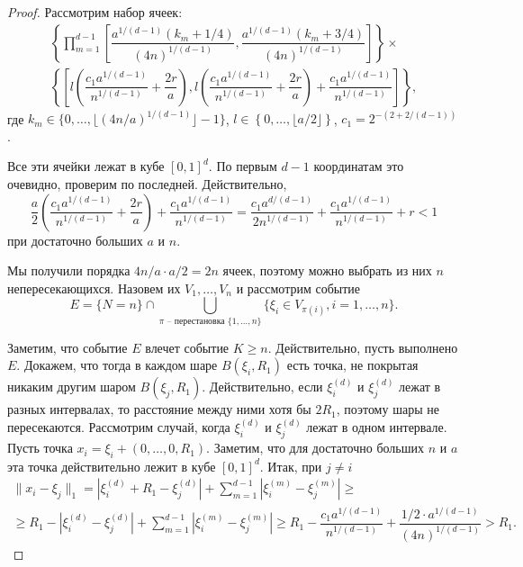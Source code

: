 \documentclass[12pt]{article}
\theoremstyle{plain}
\theoremstyle{definition}
\theoremstyle{remark}
\def\geq{\geqslant}
\begin{document}
\begin{proof}
    Рассмотрим набор ячеек: 
    \begin{multline*}
        \left\{\prod\limits_{m=1}^{d-1}\left[\dfrac{a^{1/(d-1)}(k_m+1/4)}{(4n)^{1/(d-1)}}, \dfrac{a^{1/(d-1)}(k_m+3/4)}{(4n)^{1/(d-1)}}\right]\right\}
    \times \\
    \left\{\left[l\left(\dfrac{c_1a^{1/(d-1)}}{n^{1/(d-1)}} +\dfrac{2r}{a}\right) ,  l\left(\dfrac{c_1a^{1/(d-1)}}{n^{1/(d-1)}}+\dfrac{2r}{a}\right) + \dfrac{c_1a^{1/(d-1)}}{n^{1/(d-1)}}  \right]\right\},
    \end{multline*}{}
    где $k_m \in \{0, \ldots, \lfloor (4n/a)^{1/(d-1)}\rfloor-1\}$, $l\in \left\{0, \ldots, \lfloor a/2\rfloor\right\}$, $c_1 = 2^{-(2+2/(d-1))}$. 
    
    Все эти ячейки лежат в кубе $[0,1]^d$. По первым $d-1$ координатам это очевидно, проверим по последней. Действительно, 
    \begin{equation*}
        \dfrac{a}{2}\left(\dfrac{c_1a^{1/(d-1)}}{n^{1/(d-1)}}+\dfrac{2r}{a}\right) + \dfrac{c_1a^{1/(d-1)}}{n^{1/(d-1)}} = \dfrac{c_1a^{d/(d-1)}}{2n^{1/(d-1)}} + \dfrac{c_1a^{1/(d-1)}}{n^{1/(d-1)}} + r < 1
    \end{equation*}{}
    при достаточно больших $a$ и $n$.
    
    Мы получили порядка $4n/a \cdot a/2 = 2n$ ячеек, поэтому можно выбрать из них $n$ непересекающихся. Назовем их $V_1, \ldots, V_n$  и рассмотрим событие $$E = \{N=n\}\cap \bigcup\limits_{\pi \text{ -- перестановка } \{1, \ldots, n\}} \{\xi_i \in V_{\pi(i)}, i = 1, \ldots, n\}.$$
                         
    Заметим, что событие $E$ влечет событие $K \geq n$. Действительно, пусть выполнено $E$. Докажем, что тогда в каждом шаре $B(\xi_i, R_1)$ есть точка, не покрытая никаким другим шаром $B(\xi_j, R_1)$. Действительно, если $\xi_i^{(d)}$ и $\xi_j^{(d)}$ лежат в разных интервалах, то расстояние между ними хотя бы $2R_1$, поэтому шары не пересекаются. Рассмотрим случай, когда $\xi_i^{(d)}$ и $\xi_j^{(d)}$ лежат в одном интервале. Пусть точка $x_i = \xi_i + (0, \ldots, 0, R_1)$. Заметим, что для достаточно больших $n$ и $a$ эта точка действительно лежит в кубе $[0, 1]^d$. Итак, при $j \not= i$
    \begin{multline*}
        \|x_i - \xi_j\|_1 = 
        |\xi_i^{(d)} + R_1 - \xi_j^{(d)} | + \sum_{m=1}^{d-1}|\xi_i^{(m)} - \xi_j^{(m)}| \geq\\
        \geq R_1 - |\xi_i^{(d)} - \xi_j^{(d)} | + \sum_{m=1}^{d-1}|\xi_i^{(m)} - \xi_j^{(m)}| \geq
        R_1 - \dfrac{c_1a^{1/(d-1)}}{n^{1/(d-1)}} + \dfrac{1/2\cdot a^{1/(d-1)}}{(4n)^{1/(d-1)}} > R_1.
    \end{multline*}{}
    

\end{proof}
\end{document}
